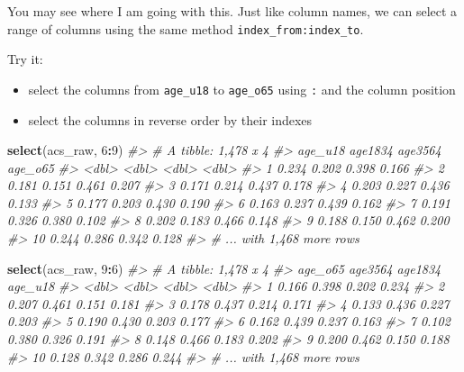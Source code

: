 \documentclass[
]{book}
\newenvironment{Shaded}{\begin{snugshade}}{\end{snugshade}}
\newcommand{\CommentTok}[1]{\textcolor[rgb]{0.56,0.35,0.01}{\textit{#1}}}
\newcommand{\DecValTok}[1]{\textcolor[rgb]{0.00,0.00,0.81}{#1}}
\newcommand{\KeywordTok}[1]{\textcolor[rgb]{0.13,0.29,0.53}{\textbf{#1}}}
\newcommand{\NormalTok}[1]{#1}
\newcommand{\OperatorTok}[1]{\textcolor[rgb]{0.81,0.36,0.00}{\textbf{#1}}}
\providecommand{\tightlist}{%
  \setlength{\itemsep}{0pt}\setlength{\parskip}{0pt}}
\begin{document}
You may see where I am going with this. Just like column names, we can select a range of columns using the same method \texttt{index\_from:index\_to}.

Try it:

\begin{itemize}
\tightlist
\item
  select the columns from \texttt{age\_u18} to \texttt{age\_o65} using \texttt{:} and the column position
\item
  select the columns in reverse order by their indexes
\end{itemize}

\begin{Shaded}
\begin{Highlighting}[]
\KeywordTok{select}\NormalTok{(acs\_raw, }\DecValTok{6}\OperatorTok{:}\DecValTok{9}\NormalTok{)}
\CommentTok{\#\textgreater{} \# A tibble: 1,478 x 4}
\CommentTok{\#\textgreater{}    age\_u18 age1834 age3564 age\_o65}
\CommentTok{\#\textgreater{}      \textless{}dbl\textgreater{}   \textless{}dbl\textgreater{}   \textless{}dbl\textgreater{}   \textless{}dbl\textgreater{}}
\CommentTok{\#\textgreater{}  1   0.234   0.202   0.398   0.166}
\CommentTok{\#\textgreater{}  2   0.181   0.151   0.461   0.207}
\CommentTok{\#\textgreater{}  3   0.171   0.214   0.437   0.178}
\CommentTok{\#\textgreater{}  4   0.203   0.227   0.436   0.133}
\CommentTok{\#\textgreater{}  5   0.177   0.203   0.430   0.190}
\CommentTok{\#\textgreater{}  6   0.163   0.237   0.439   0.162}
\CommentTok{\#\textgreater{}  7   0.191   0.326   0.380   0.102}
\CommentTok{\#\textgreater{}  8   0.202   0.183   0.466   0.148}
\CommentTok{\#\textgreater{}  9   0.188   0.150   0.462   0.200}
\CommentTok{\#\textgreater{} 10   0.244   0.286   0.342   0.128}
\CommentTok{\#\textgreater{} \# ... with 1,468 more rows}
\end{Highlighting}
\end{Shaded}

\begin{Shaded}
\begin{Highlighting}[]
\KeywordTok{select}\NormalTok{(acs\_raw, }\DecValTok{9}\OperatorTok{:}\DecValTok{6}\NormalTok{)}
\CommentTok{\#\textgreater{} \# A tibble: 1,478 x 4}
\CommentTok{\#\textgreater{}    age\_o65 age3564 age1834 age\_u18}
\CommentTok{\#\textgreater{}      \textless{}dbl\textgreater{}   \textless{}dbl\textgreater{}   \textless{}dbl\textgreater{}   \textless{}dbl\textgreater{}}
\CommentTok{\#\textgreater{}  1   0.166   0.398   0.202   0.234}
\CommentTok{\#\textgreater{}  2   0.207   0.461   0.151   0.181}
\CommentTok{\#\textgreater{}  3   0.178   0.437   0.214   0.171}
\CommentTok{\#\textgreater{}  4   0.133   0.436   0.227   0.203}
\CommentTok{\#\textgreater{}  5   0.190   0.430   0.203   0.177}
\CommentTok{\#\textgreater{}  6   0.162   0.439   0.237   0.163}
\CommentTok{\#\textgreater{}  7   0.102   0.380   0.326   0.191}
\CommentTok{\#\textgreater{}  8   0.148   0.466   0.183   0.202}
\CommentTok{\#\textgreater{}  9   0.200   0.462   0.150   0.188}
\CommentTok{\#\textgreater{} 10   0.128   0.342   0.286   0.244}
\CommentTok{\#\textgreater{} \# ... with 1,468 more rows}
\end{Highlighting}
\end{Shaded}
\end{document}
